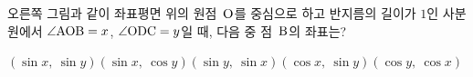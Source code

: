 \noindent\begin{minipage}[t]{0.58\linewidth}\vspace{0pt}\raggedright 오른쪽 그림과 같이 좌표평면 위의 원점~$\mathrm{O}$를 중심으로 하고 반지름의 길이가 $1$인 사분원에서 $\angle\mathrm{AOB}=x$, $\angle\mathrm{ODC}=y$일 때, 다음 중 점~$\mathrm{B}$의 좌표는?\end{minipage}\hfill\begin{minipage}[t]{0.4\linewidth}\vspace{0pt}\centering \resizebox{\ifdim\width>\linewidth\linewidth\else\width\fi}{!}{}\end{minipage}\par
\begin{choicesii}{$(\sin x,\ \sin y)$}{$(\sin x,\ \cos y)$}{$(\sin y,\ \sin x)$}{$(\cos x,\ \sin y)$}{$(\cos y,\ \cos x)$}\end{choicesii}
